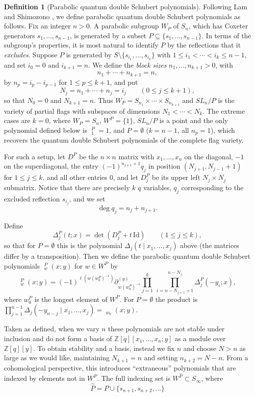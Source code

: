 \documentclass{amsart}
\theoremstyle{definition}
\newtheorem{definition}[lemma]{Definition}
\theoremstyle{remark}
\numberwithin{equation}{section}
\DeclareMathOperator{\qsch}{\widetilde{\mathfrak{S}}}
\newcommand{\pcomp}[1]{\widehat{#1}}
\begin{document}
\begin{definition}[Parabolic quantum double Schubert polynomials] \label{def:parabolic}
	Following Lam and Shimozono \cite{lam2014quantum}, we define parabolic quantum double Schubert polynomials as follows. Fix an integer $n>0$. A parabolic subgroup $W_P$ of $S_{n}$, which has Coxeter generators $s_1,\ldots,s_{n-1}$, is generated by a subset $P\subseteq \{s_1,\ldots,s_{n-1}\}$. In terms of the subgroup's properties, it is most natural to identify $P$ by the reflections that it \emph{excludes}. Suppose $P$ is generated by $S\setminus \{s_{i_1},\ldots,s_{i_k}\}$ with $1\leq i_1<\cdots<i_k\leq n-1$, and set $i_0=0$ and $i_{k+1}=n$. We define the \emph{block sizes} $n_1,\ldots,n_{k+1}>0$, with
	$$n_1+\cdots+n_{k+1}=n,$$
	by $n_p = i_{p} - i_{p-1}$ for $1\leq p\leq k+1$, and put
	$$N_j = n_1+\cdots+n_j=i_j\qquad(0\leq j\leq k+1),$$
	so that $N_0=0$ and $N_{k+1}=n$. Thus $W_P=S_{n_1}\times\cdots\times S_{n_{k+1}}$ and $SL_n/P$ is the variety of partial flags with subspaces of dimensions $N_1<\cdots<N_k$. The extreme cases are $k=0$, where $W_P=S_n$, $W^P=\{1\}$, $SL_n/P$ is a point and the only polynomial defined below is $\qsch^P_1=1$, and $P=\emptyset$ ($k=n-1$, all $n_p=1$), which recovers the quantum double Schubert polynomials of the complete flag variety.
	
	For such a setup, let $D^P$ be the $n\times n$ matrix with $x_1,\ldots,x_n$ on the diagonal, $-1$ on the superdiagonal, the entry $(-1)^{n_{j+1}+1}q_j$ in position $(N_{j+1},N_{j-1}+1)$ for $1\leq j\leq k$, and all other entries $0$, and let $D^P_j$ be its upper left $N_j\times N_j$ submatrix. Notice that there are precisely $k$ $q$ variables, $q_j$ corresponding to the excluded reflection $s_{i_j}$, and we set
	$$\deg q_j = n_j + n_{j+1}.$$  
	
	Define 
	$$\Delta^P_j(t;x)=\det(D^P_j+t\,\mathrm{Id})\qquad(1\leq j\leq k),$$
	so that for $P=\emptyset$ this is the polynomial $\Delta_j(t\mid x_1,\ldots,x_j)$ above (the matrices differ by a transposition). Then we define the parabolic quantum double Schubert polynomials $\qsch_w^P(x;y)$ for $w\in W^P$ by
	$$\qsch^P_w(x;y)=(-1)^{\ell(w(w_0^P)^{-1})}\partial_{w(w_0^P)^{-1}}^{(y)}\prod_{j=1}^k\ \prod_{i=n-N_{j+1}+1}^{n-N_j} \Delta^P_j(-y_i;x),$$
	where $w_0^P$ is the longest element of $W^P$. For $P=\emptyset$ the product is $\prod_{j=1}^{n-1}\Delta_j(-y_{n-j}\mid x_1,\ldots,x_j)=\qsch_{w_0}(x;y)$.
	
	Taken as defined, when we vary $n$ these polynomials are not stable under inclusion and do not form a basis of $\mathbb{Z}[q][x_1,\ldots,x_n;y]$ as a module over $\mathbb{Z}[q][y]$. To obtain stability and a basis, instead we fix $n$ and choose $N>n$ as large as we would like, maintaining $N_{k+1}=n$ and setting $n_{k+2} = N-n$. From a cohomological perspective, this introduces ``extraneous'' polynomials that are indexed by elements not in $W^P$. The full indexing set is $W^{\pcomp{P}}\subset S_\infty$, where
	$$\pcomp{P} = P \cup \{s_{n+1},s_{n+2},\ldots\}$$
\end{definition}
\end{document}
